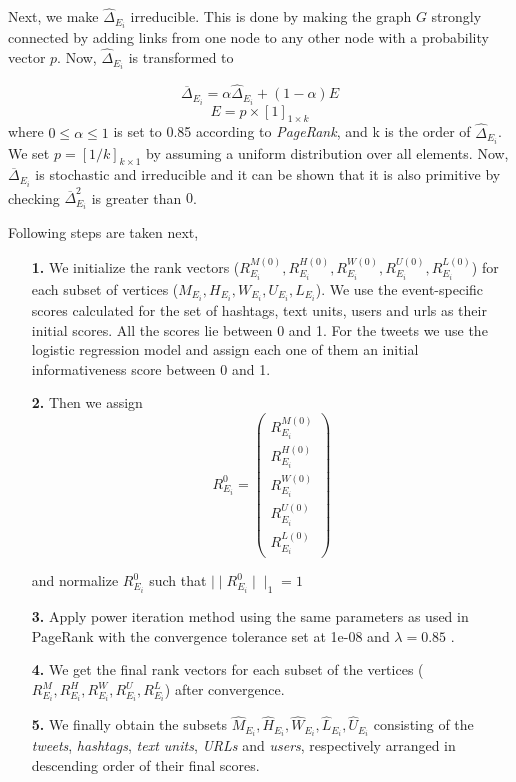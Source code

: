 Next, we make $\hat \Delta_{E_{i}}$ irreducible. This is done by making the graph $G$ strongly connected by adding links from one node to any other node with a probability vector $p$. Now, $\hat \Delta_{E_{i}}$ is transformed to 

\begin{equation}
\overline \Delta_{E_{i}} = \alpha \hat \Delta_{E_{i}} + (1-\alpha)E
\end{equation}
\begin{equation}
E = p \times [1]_{1 \times k}
\end{equation}
where $0 \le \alpha \le 1$ is set to 0.85 according to \textit{PageRank}, and k is the order of $\hat \Delta_{E_{i}}$. We set $p = [1/k]_{k \times 1}$ by assuming a uniform distribution over all elements. Now, $\overline \Delta_{E_{i}}$ is stochastic and irreducible and it can be shown that it is also primitive by checking $\overline \Delta_{E_{i}}^{2}$ is greater than $0$.

Following steps are taken next,
\begin{itemize}
\item[\textbf{1.}] We initialize the rank vectors ($ R_{{E_{i}}}^{M(0)}, R_{{E_{i}}}^{H(0)}, R_{{E_{i}}}^{W(0)}, R_{{E_{i}}}^{U(0)}, R_{{E_{i}}}^{L(0)}$) for each subset of vertices ($M_{E_{i}}, H_{E_{i}}, W_{E_{i}}, U_{E_{i}}, L_{E_{i}}$). We use the event-specific scores calculated for the set of hashtags, text units, users and urls as their initial scores. All the scores lie between 0 and 1. For the tweets we use the logistic regression model and assign each one of them an initial informativeness score between 0 and 1.

\item[\textbf{2.}] Then we assign
\[ R_{E_{i}}^{0} = \left( \begin{array}{c}
R_{{E_{i}}}^{M(0)} \\
R_{{E_{i}}}^{H(0)} \\
R_{{E_{i}}}^{W(0)} \\
R_{{E_{i}}}^{U(0)} \\
R_{{E_{i}}}^{L(0)} \end{array} \right)\] 

and normalize $R_{E_{i}}^{0}$ such that $\mid \mid R_{E_{i}}^{0}\mid \mid_{1} = 1$

\item[\textbf{3.}] Apply power iteration method using the same parameters as used in PageRank with the convergence tolerance set at 1e-08 and $\lambda = 0.85$ .

\item[\textbf{4.}] We get the final rank vectors for each subset of the vertices ($R_{{E_{i}}}^{M}, R_{{E_{i}}}^{H}, R_{{E_{i}}}^{W}, R_{{E_{i}}}^{U}, R_{{E_{i}}}^{L}$) after convergence. 

\item[\textbf{5.}] We finally obtain the subsets $\hat{M}_{E_{i}}, \hat{H}_{E_{i}}, \hat{W}_{E_{i}}, \hat{L}_{E_{i}}, \hat{U}_{E_{i}}$ consisting of the \textit{tweets}, \textit{hashtags}, \textit{text units}, \textit{URLs} and \textit{users}, respectively arranged in descending order of their final scores.

\end{itemize}

